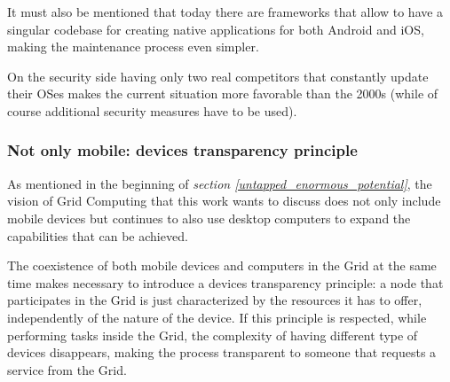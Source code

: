 It must also be mentioned that today there are frameworks that allow to have a singular codebase for creating native applications for both Android and iOS, making the maintenance process even simpler.

On the security side having only two real competitors that constantly update their OSes makes the current situation more favorable than the 2000s (while of course additional security measures have to be used).

\subsubsection{Not only mobile: devices transparency principle}
As mentioned in the beginning of \textit{section \ref{untapped_enormous_potential}}, the vision of Grid Computing that this work wants to discuss does not only include mobile devices but continues to also use desktop computers to expand the capabilities that can be achieved.

The coexistence of both mobile devices and computers in the Grid at the same time makes necessary to introduce a devices transparency principle: a node that participates in the Grid is just characterized by the resources it has to offer, independently of the nature of the device. If this principle is respected, while performing tasks inside the Grid, the complexity of having different type of devices disappears, making the process transparent to someone that requests a service from the Grid.
